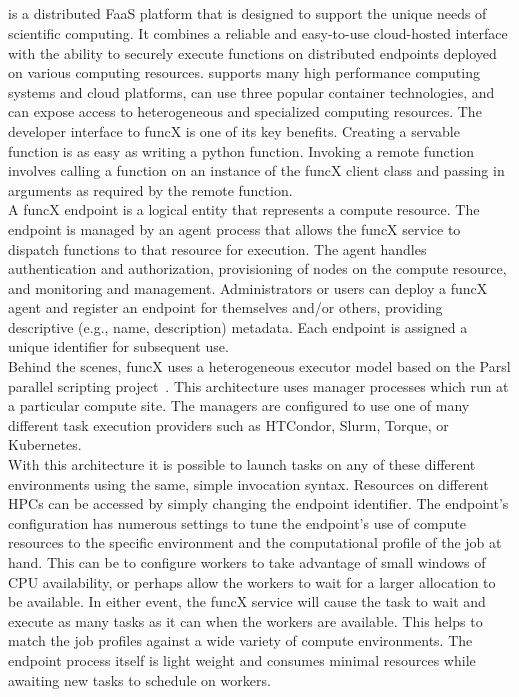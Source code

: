 \subsection{\funcX{}}\label{subsec:funcX}
\funcX{} is a distributed FaaS platform that is designed to support the unique needs of scientific computing. It combines a reliable and easy-to-use cloud-hosted interface with the ability to securely execute functions on distributed endpoints deployed on various computing resources. \funcX{} supports many high performance computing systems and cloud platforms, can use three popular container technologies, and can expose access to heterogeneous and specialized computing resources. The developer interface to funcX is one of its key benefits. Creating a servable function is as easy as writing a python function. Invoking a remote function involves calling a function on an instance of the funcX client class and passing in arguments as required by the remote function.\\

A funcX endpoint is a logical entity that represents a compute resource. The endpoint is managed by an agent process that allows the funcX service to dispatch functions to that resource for execution. The agent handles authentication and authorization, provisioning of nodes on the compute resource, and monitoring and management. Administrators or users can deploy a funcX agent and register an endpoint for themselves and/or others, providing descriptive (e.g., name, description) metadata. Each endpoint is assigned a unique identifier for subsequent use.
\\

Behind the scenes, funcX uses a heterogeneous executor model based on the Parsl parallel scripting project~\cite{Parsl_paper}.  This architecture uses manager processes which run at a particular compute site. The managers are configured to use one of many different task execution providers such as HTCondor, Slurm, Torque, or Kubernetes.\\

With this architecture it is possible to launch tasks on any of these different environments using the same, simple invocation syntax. Resources on different HPCs can be accessed by simply changing the endpoint identifier. The endpoint's configuration has numerous settings to tune the endpoint's use of compute resources to the specific environment and the computational profile of the job at hand. This can be to configure workers to take advantage of small windows of CPU availability, or perhaps allow the workers to wait for a larger allocation to be available. In either event, the funcX service will cause the task to wait and execute as many tasks as it can when the workers are available.  This helps to match the job profiles against a wide variety of compute environments. The endpoint process itself is light weight and consumes minimal resources while awaiting new tasks to schedule on workers.\\

